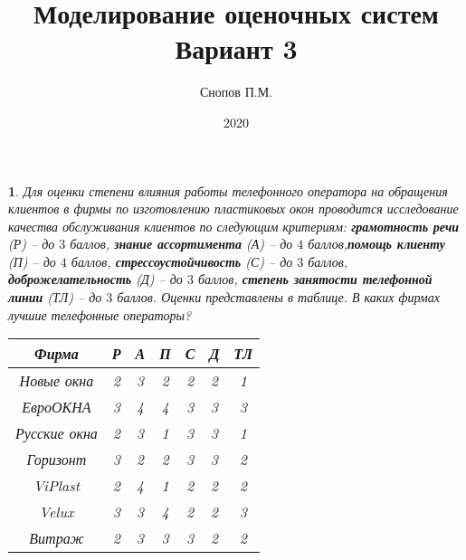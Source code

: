 \documentclass[11pt,a4paper,oneside]{article}
\title{Моделирование оценочных систем \protect \\ Вариант 3}
\date{2020}
\author{Снопов П.М.}
\newenvironment{problem}{
	\medskip
	\begin{problem-internal}
	}{
	\end{problem-internal}
}
\newtheorem{problem-internal}{}
\begin{document}
	\maketitle
	\begin{problem}
		Для оценки степени влияния работы телефонного оператора на обращения клиентов в фирмы по изготовлению пластиковых окон проводится исследование качества обслуживания клиентов по следующим критериям: {\bf грамотность речи} (Р) -- до $3$ баллов, {\bf знание ассортимента} (А) -- до $4$ баллов,{\bf помощь клиенту} (П) -- до $4$ баллов, {\bf стрессоустойчивость} (С) -- до $3$ баллов, {\bf доброжелательность} (Д) -- до $3$ баллов, {\bf степень занятости телефонной линии} (ТЛ) -- до $3$ баллов. Оценки представлены в таблице. В каких фирмах лучшие телефонные операторы?
		\begin{table}[!hbtp]
			\centering
			\begin{tabular}{|c|c|c|c|c|c|c|}
				\hline
				Фирма        & Р & А & П & С & Д & ТЛ \\ \hline
				Новые окна   & 2 & 3 & 2 & 2 & 2 & 1  \\ \hline
				ЕвроОКНА     & 3 & 4 & 4 & 3 & 3 & 3  \\ \hline
				Русские окна & 2 & 3 & 1 & 3 & 3 & 1  \\ \hline
				Горизонт     & 3 & 2 & 2 & 3 & 3 & 2  \\ \hline
				ViPlast      & 2 & 4 & 1 & 2 & 2 & 2  \\ \hline
				Velux        & 3 & 3 & 4 & 2 & 2 & 3  \\ \hline
				Витраж       & 2 & 3 & 3 & 3 & 2 & 2  \\ \hline
			\end{tabular}
		\end{table}
	\end{problem}
\end{document}
